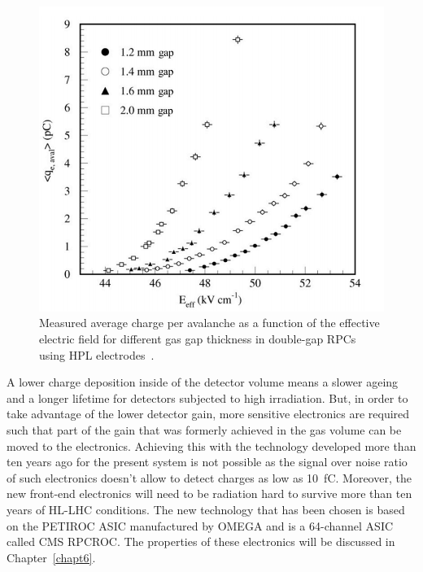 \begingroup\setlength{\intextsep}{5pt}\setlength{\columnsep}{15pt}

	\begin{figure}
		\centering
		\includegraphics[width=\linewidth]{fig/chapt3/charge-vs-gap.png}
		\caption{\label{fig:charge-gap} Measured average charge per avalanche as a function of the effective electric field for different gas gap thickness in double-gap RPCs using HPL electrodes~\cite{PHASEIITP}.}
	\end{figure}
	
	A lower charge deposition inside of the detector volume means a slower ageing and a longer lifetime for detectors subjected to high irradiation. But, in order to take advantage of the lower detector gain, more sensitive electronics are required such that part of the gain that was formerly achieved in the gas volume can be moved to the electronics. Achieving this with the technology developed more than ten years ago for the present system is not possible as the signal over noise ratio of such electronics doesn't allow to detect charges as low as \SI{10}{fC}. Moreover, the new front-end electronics will need to be radiation hard to survive more than ten years of HL-LHC conditions. The new technology that has been chosen is based on the PETIROC ASIC manufactured by OMEGA and is a 64-channel ASIC called CMS RPCROC\cite{PETIROCIEEE,PETIROCTWEPP,PHASEIITP}. The properties of these electronics will be discussed in Chapter~\ref{chapt6}.
	
